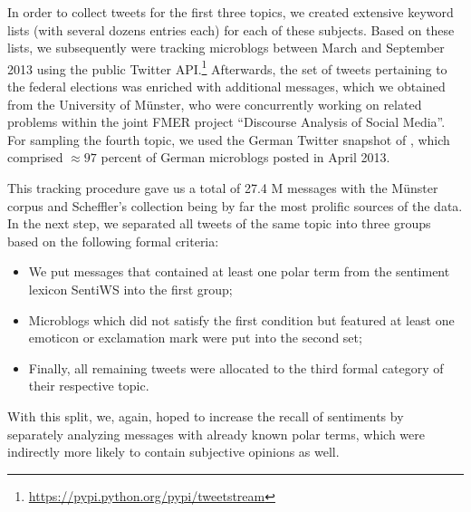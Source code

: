 In order to collect tweets for the first three topics, we created
extensive keyword lists (with several dozens entries each) for each of
these subjects.  Based on these lists, we subsequently were tracking
microblogs between March and September 2013 using the public Twitter
API.\footnote{\url{https://pypi.python.org/pypi/tweetstream}}
Afterwards, the set of tweets pertaining to the federal elections was
enriched with additional messages, which we obtained from the
University of M\"unster, who were concurrently working on related
problems within the joint FMER project ``Discourse Analysis of Social
Media''.  For sampling the fourth topic, we used the German Twitter
snapshot of \citet{Scheffler:14}, which comprised $\approx97$ percent
of German microblogs posted in April 2013.






This tracking procedure gave us a total of 27.4 M messages with the
M\"unster corpus and Scheffler's collection being by far the most
prolific sources of the data.  In the next step, we separated all
tweets of the same topic into three groups based on the following
formal criteria:
\begin{itemize}
\item We put messages that contained at least one polar term from the
  sentiment lexicon SentiWS \cite{Remus:10} into the first group;
\item Microblogs which did not satisfy the first condition but
  featured at least one emoticon or exclamation mark were put into the
  second set;
\item Finally, all remaining tweets were allocated to the third formal
  category of their respective topic.
\end{itemize}
With this split, we, again, hoped to increase the recall of sentiments
by separately analyzing messages with already known polar terms, which
were indirectly more likely to contain subjective opinions as well.

